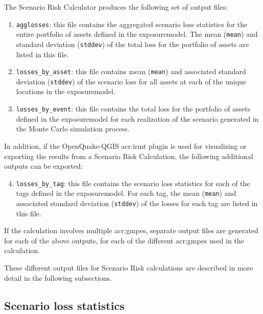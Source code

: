 The Scenario Risk Calculator produces the following set of output files:

\begin{enumerate}

  \item \Verb+agglosses+: this file contains the aggregated scenario
    loss statistics for the entire portfolio of \glspl{asset} defined
    in the \gls{exposuremodel}. The mean (\Verb+mean+) and standard
    deviation (\Verb+stddev+) of the total loss for the portfolio of
    \glspl{asset} are listed in this file.

  \item \Verb+losses_by_asset+: this file contains mean (\Verb+mean+) and
    associated standard deviation (\Verb+stddev+) of the scenario loss for all
    \glspl{asset} at each of the unique locations in the \gls{exposuremodel}.

  \item \Verb+losses_by_event+: this file contains the total loss for the
    portfolio of \glspl{asset} defined in the \gls{exposuremodel} for each
    realization of the scenario generated in the Monte Carlo simulation process.

\end{enumerate}

In addition, if the OpenQuake-QGIS \gls{acr:irmt} plugin is used for
visualizing or exporting the results from a Scenario Risk Calculation, the
following additional outputs can be exported:

\begin{enumerate}
\setcounter{enumi}{3}

  \item \Verb+losses_by_tag+: this file contains the scenario
    loss statistics for each of the \glspl{tag} defined in the
    \gls{exposuremodel}. For each \gls{tag}, the mean (\Verb+mean+)
    and associated standard deviation (\Verb+stddev+)
    of the losses for each tag are listed in this file.

\end{enumerate}

If the calculation involves multiple \glspl{acr:gmpe}, separate output files
are generated for each of the above outputs, for each of the different
\glspl{acr:gmpe} used in the calculation.

These different output files for Scenario Risk calculations are described in
more detail in the following subsections.


\subsection{Scenario loss statistics}
\label{subsec:scenario_loss_statistics}

